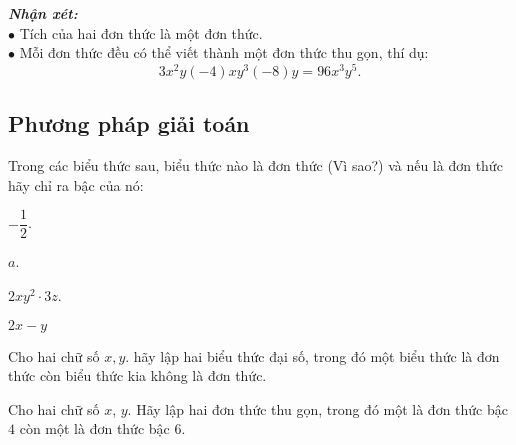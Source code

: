 \textbf{\textit{Nhận xét:}}\\
$\bullet$ Tích của hai đơn thức là một đơn thức.\\
$\bullet$ Mỗi đơn thức đều có thể viết thành một đơn thức thu gọn, thí dụ: $$3x^2y(-4)xy^3(-8)y=96x^3y^5.$$

\subsection{Phương pháp giải toán}
\begin{vd}%
	Trong các biểu thức sau, biểu thức nào là đơn thức (Vì sao?) và nếu là đơn thức hãy chỉ ra bậc của nó:
	\begin{listEX}[4]
		\item $-\dfrac{1}{2}$.
		\item $a$.
		\item $2xy^2\cdot 3z$.
		\item $2x-y$
	\end{listEX}
\end{vd}

\begin{vd}%
	Cho hai chữ số $x, y$. hãy lập hai biểu thức đại số, trong đó một biểu thức là đơn thức còn biểu thức kia không là đơn thức.
\end{vd}

\begin{vd}%
	Cho hai chữ số $x$, $y$. Hãy lập hai đơn thức thu gọn, trong đó một là đơn thức bậc $4$ còn một là đơn thức bậc $6$.
\end{vd}

